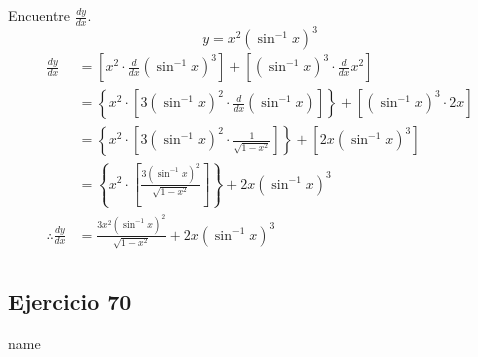 \documentclass[12pt]{article}
\begin{document}
Encuentre $\frac{dy}{dx}$.
\[
y=x^2(\sin^{-1}{x})^3
\]
\begin{equation*}
  \begin{split}
    \frac{dy}{dx}
    &= \left[x^2\cdot \frac{d}{dx}(\sin^{-1}{x})^3 \right] + \left[(\sin^{-1}{x})^3\cdot \frac{d}{dx}x^2\right] \\
    &= \left\lbrace x^2\cdot \left[3(\sin^{-1}{x})^2\cdot \frac{d}{dx}(\sin^{-1}{x}) \right] \right\rbrace + \left[(\sin^{-1}{x})^3\cdot 2x\right] \\
    &= \left\lbrace x^2\cdot \left[3(\sin^{-1}{x})^2\cdot \frac{1}{\sqrt{1-x^2}} \right] \right\rbrace + \left[2x(\sin^{-1}{x})^3\right] \\
    &= \left\lbrace x^2\cdot \left[ \frac{3(\sin^{-1}{x})^2}{\sqrt{1-x^2}} \right] \right\rbrace + 2x(\sin^{-1}{x})^3 \\
    \therefore
    \frac{dy}{dx}
    &= \frac{3x^2(\sin^{-1}{x})^2}{\sqrt{1-x^2}} + 2x(\sin^{-1}{x})^3 \\
  \end{split}
\end{equation*}

\subsection{Ejercicio 70} name \\
\end{document}
